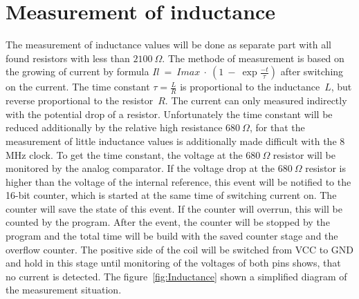 \section{Measurement of inductance}
The measurement of inductance values will be done as separate part with all found resistors with
less than \(2100~\Omega\).
The methode of measurement is based on the growing of current by formula \(Il~=~Imax~\cdot~(1~-~\exp{\frac{-t}{\tau}})\) 
after switching on the current.
The time constant \(\tau = \frac{L}{R}\) is proportional to the inductance~\(L\), but reverse proportional to the
resistor~\(R\). 
The current can only measured indirectly with the potential drop of a resistor.
Unfortunately the time constant will be reduced additionally by the relative high resistance \(680~\Omega\),
for that the measurement of little inductance values is additionally made difficult with the 8 MHz clock.
To get the time constant, the voltage at the \(680~\Omega\) resistor will be monitored by the analog
comparator.
If the voltage drop at the \(680~\Omega\) resistor is higher than the voltage of the internal reference, this
event will be notified to the 16-bit counter, which is started at the same time of switching current on.
The counter will save the state of this event.
If the counter will overrun, this will be counted by the program.
After the event, the counter will be stopped by the program and the total time will be build with the saved
counter stage and the overflow counter.
The positive side of the coil will be switched from VCC to GND and hold in this stage until  monitoring 
of the voltages of both pins shows, that no current is detected.
The figure~\ref{fig:Inductance} shown a simplified diagram of the measurement situation.


